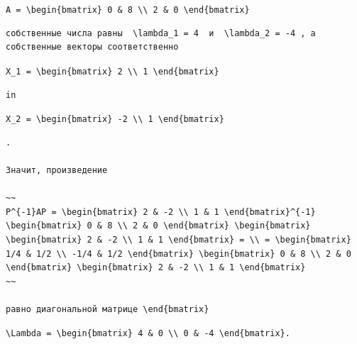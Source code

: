 \documentclass[
  ukrainian,
]{article}
\begin{document}
\texttt{A\ =\ \textbackslash{}begin\{bmatrix\}\ 0\ \&\ 8\ \textbackslash{}\textbackslash{}\ 2\ \&\ 0\ \textbackslash{}end\{bmatrix\}}

\begin{verbatim}
собственные числа равны  \lambda_1 = 4  и  \lambda_2 = -4 , а собственные векторы соответственно
\end{verbatim}

\texttt{X\_1\ =\ \textbackslash{}begin\{bmatrix\}\ 2\ \textbackslash{}\textbackslash{}\ 1\ \textbackslash{}end\{bmatrix\}}

\begin{verbatim}
in
\end{verbatim}

\texttt{X\_2\ =\ \textbackslash{}begin\{bmatrix\}\ -2\ \textbackslash{}\textbackslash{}\ 1\ \textbackslash{}end\{bmatrix\}}

\begin{verbatim}
.

Значит, произведение

~~
P^{-1}AP = \begin{bmatrix} 2 & -2 \\ 1 & 1 \end{bmatrix}^{-1} \begin{bmatrix} 0 & 8 \\ 2 & 0 \end{bmatrix} \begin{bmatrix} \begin{bmatrix} 2 & -2 \\ 1 & 1 \end{bmatrix} = \\ = \begin{bmatrix} 1/4 & 1/2 \\ -1/4 & 1/2 \end{bmatrix} \begin{bmatrix} 0 & 8 \\ 2 & 0 \end{bmatrix} \begin{bmatrix} 2 & -2 \\ 1 & 1 \end{bmatrix}
~~

равно диагональной матрице \end{bmatrix}
\end{verbatim}

\texttt{\textbackslash{}Lambda\ =\ \textbackslash{}begin\{bmatrix\}\ 4\ \&\ 0\ \textbackslash{}\textbackslash{}\ 0\ \&\ -4\ \textbackslash{}end\{bmatrix\}.}
\end{document}
